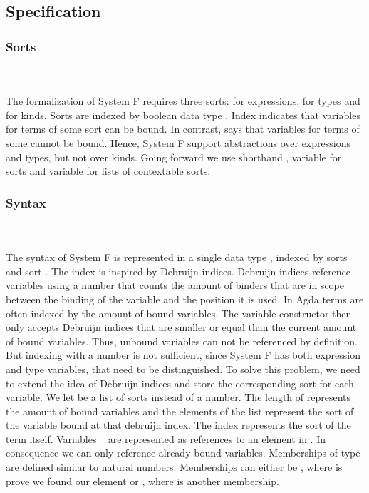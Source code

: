 \subsection{Specification}
\subsubsection{Sorts}\hfill\\\\
The formalization of System F requires three sorts:  for expressions,  for types and  for kinds. 
\FSort
Sorts are indexed by boolean data type . 
Index  indicates that variables for terms of some sort  can be bound. 
In contrast,  says that variables for terms of some  cannot be bound. 
Hence, System F support abstractions over expressions and types, but not over kinds. 
Going forward we use shorthand \FSorts, variable  for sorts and variable  for lists of contextable sorts.

\subsubsection{Syntax}\hfill\\\\
The syntax of System F is represented in a single data type , indexed by sorts  and sort . 
The index  is inspired by Debruijn indices. Debruijn indices reference variables using a number that counts the amount of binders that are in scope between the binding of the variable and the position it is used.
In Agda terms are often indexed by the amount of bound variables. The variable constructor then only accepts Debruijn indices that are smaller or equal than the current amount of bound variables. 
Thus, unbound variables can not be referenced by definition.
But indexing  with a number is not sufficient, since System F has both expression and type variables, that need to be distinguished. 
To solve this problem, we need to extend the idea of Debruijn indices and store the corresponding sort for each variable. We let  be a list of sorts instead of a number.
The length of  represents the amount of bound variables and the elements  of the list represent the sort of the variable bound at that debruijn index. 
The index  represents the sort of the term itself.
\FTerm
Variables \  are represented as references    to an element in . In consequence we can only reference already bound variables.
Memberships of type    are defined similar to natural numbers. 
Memberships can either be , where  is prove we found our element or  , where  is another membership. 

